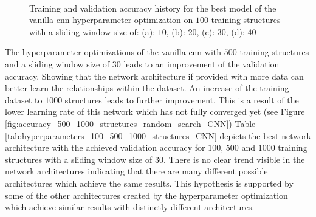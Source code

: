 \documentclass[conference]{IEEEtran}
\begin{document}
\begin{figure}[htp]
	\centering
	\quad
	\\
	\quad
	\caption{Training and validation accuracy history for the best model of the vanilla \gls{cnn} hyperparameter optimization on $ 100 $ training structures with a sliding window size of: (a): $ 10 $, (b): $ 20 $, (c): $ 30 $, (d): $ 40 $}
	\label{fig:accuracy_100_structures_random_search_cnn}
\end{figure}

The hyperparameter optimizations of the vanilla \gls{cnn} with $ 500 $ training structures and a sliding window size of $ 30 $ leads to an improvement of the validation accuracy. Showing that the network architecture if provided with more data can better learn the relationships within the dataset. An increase of the training dataset to $ 1000 $ structures leads to further improvement. This is a result of the lower learning rate of this network which has not fully converged yet (see Figure \ref{fig:accuracy_500_1000_structures_random_search_CNN})  Table \ref{tab:hyperparameters_100_500_1000_structures_CNN} depicts the best network architecture with the achieved validation accuracy for $ 100 $, $ 500 $ and $ 1000 $ training structures with a sliding window size of $ 30 $. There is no clear trend visible in the network architectures indicating that there are many different possible architectures which achieve the same results. This hypothesis is supported by some of the other architectures created by the hyperparameter optimization which achieve similar results with distinctly different architectures.
\end{document}
